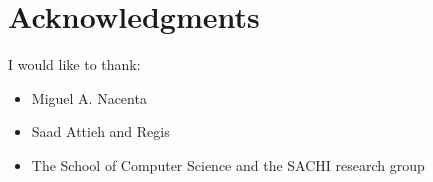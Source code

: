 \section{Acknowledgments}
I would like to thank:
\begin{itemize}
\item Miguel A. Nacenta
\item Saad Attieh and Regis
\item The School of Computer Science and the SACHI research group
\end{itemize}